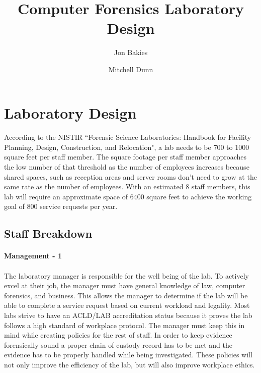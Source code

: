 \documentclass{article}
\begin{document}
\title{Computer Forensics Laboratory Design}
\author{Jon Bakies \and Mitchell Dunn} 

\maketitle
\newpage

\tableofcontents
\newpage


\section{Laboratory Design}
\paragraph{} According to the NISTIR ``Forensic Science Laboratories: Handbook for Facility Planning, Design, Construction, and Relocation", a lab needs to be 700 to 1000 square feet per staff member.
The square footage per staff member approaches the low number of that threshold as the number of employees increases because shared spaces, such as reception areas and server rooms don't need to grow at the same rate as the number of employees.
With an estimated 8 staff members, this lab will require an approximate space of 6400 square feet to achieve the working goal of 800 service requests per year.

\subsection{Staff Breakdown}
\paragraph {Management - 1} 
\paragraph{} The laboratory manager is responsible for the well being of the lab.
To actively excel at their job, the manager must have general knowledge of law, computer forensics, and business.
This allows the manager to determine if the lab will be able to complete a service request based on current workload and legality. 
Most labs strive to have an ACLD/LAB accreditation status because it proves the lab follows a high standard of workplace protocol.
The manager must keep this in mind while creating policies for the rest of staff.
In order to keep evidence forensically sound a proper chain of custody record has to be met and the evidence has to be properly handled while being investigated.
These policies will not only improve the efficiency of the lab, but will also improve workplace ethics.
\end{document}
